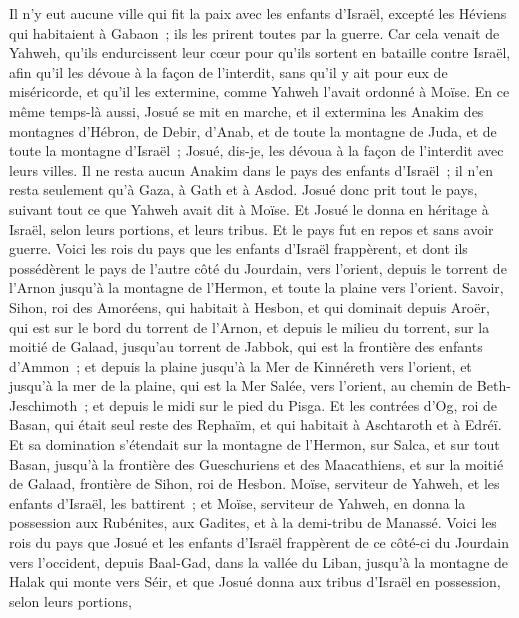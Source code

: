 \begin{multicols}{2}
Il n'y eut aucune ville qui fit la paix avec les enfants d'Israël, excepté les Héviens qui habitaient à Gabaon~; ils les prirent toutes par la guerre.
Car cela venait de Yahweh, qu'ils endurcissent leur cœur pour qu'ils sortent en bataille contre Israël, afin qu'il les dévoue à la façon de l'interdit, sans qu'il y ait pour eux de miséricorde, et qu'il les extermine, comme Yahweh l'avait ordonné à Moïse.
En ce même temps-là aussi, Josué se mit en marche, et il extermina les Anakim des montagnes d'Hébron, de Debir, d'Anab, et de toute la montagne de Juda, et de toute la montagne d'Israël~; Josué, dis-je, les dévoua à la façon de l'interdit avec leurs villes.
Il ne resta aucun Anakim dans le pays des enfants d'Israël~; il n'en resta seulement qu'à Gaza, à Gath et à Asdod.
Josué donc prit tout le pays, suivant tout ce que Yahweh avait dit à Moïse. Et Josué le donna en héritage à Israël, selon leurs portions, et leurs tribus. Et le pays fut en repos et sans avoir guerre.
\VerseOne{}Voici les rois du pays que les enfants d'Israël frappèrent, et dont ils possédèrent le pays de l'autre côté du Jourdain, vers l'orient, depuis le torrent de l'Arnon jusqu'à la montagne de l'Hermon, et toute la plaine vers l'orient.
Savoir, Sihon, roi des Amoréens, qui habitait à Hesbon, et qui dominait depuis Aroër, qui est sur le bord du torrent de l'Arnon, et depuis le milieu du torrent, sur la moitié de Galaad, jusqu'au torrent de Jabbok, qui est la frontière des enfants d'Ammon~;
et depuis la plaine jusqu'à la Mer de Kinnéreth vers l'orient, et jusqu'à la mer de la plaine, qui est la Mer Salée, vers l'orient, au chemin de Beth-Jeschimoth~; et depuis le midi sur le pied du Pisga.
Et les contrées d'Og, roi de Basan, qui était seul reste des Rephaïm, et qui habitait à Aschtaroth et à Edréï.
Et sa domination s'étendait sur la montagne de l'Hermon, sur Salca, et sur tout Basan, jusqu'à la frontière des Gueschuriens et des Maacathiens, et sur la moitié de Galaad, frontière de Sihon, roi de Hesbon.
Moïse, serviteur de Yahweh, et les enfants d'Israël, les battirent~; et Moïse, serviteur de Yahweh, en donna la possession aux Rubénites, aux Gadites, et à la demi-tribu de Manassé.
Voici les rois du pays que Josué et les enfants d'Israël frappèrent de ce côté-ci du Jourdain vers l'occident, depuis Baal-Gad, dans la vallée du Liban, jusqu'à la montagne de Halak qui monte vers Séir, et que Josué donna aux tribus d'Israël en possession, selon leurs portions,

\end{multicols}
